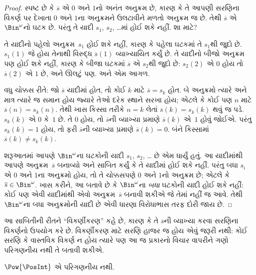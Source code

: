 \begin{proof}
સ્પષ્ટ છે કે $\overline{s}$ એ $0$ અને $1$નો અનંત અનુક્રમ છે,
કારણ કે તે આપણી સરણિના વિકર્ણ પર દેખાતા $0$ અને $1$ના
અનુક્રમને ઉલટાવીને મળતો અનુક્રમ જ છે. તેથી $\overline{s}$ એ
$\Bin^\omega$નો ઘટક છે. પરંતુ તે યાદી
$s_1$, $s_2$, \dots{}માં હોઈ શકે નહીં. શા માટે?

તે યાદીનો પહેલો અનુક્રમ~$s_1$ હોઈ શકે નહીં, કારણ કે પહેલા
ઘટકમાં તે $s_1$થી જુદો છે. $s_1(1)$ જે હોય તેનાથી
વિરુદ્ધ $\overline{s}(1)$ વ્યાખ્યાયિત કર્યું છે. તે યાદીનો
બીજો અનુક્રમ પણ હોઈ શકે નહીં, કારણ કે બીજા ઘટકમાં
$\overline{s}$ એ $s_2$થી જુદો છે: $s_2(2)$ એ $0$ હોય તો
$\overline{s}(2)$ એ $1$ છે, અને ઊલટું પણ. અને એમ આગળ.

વધુ ચોક્કસ રીતે: જો $\overline{s}$ યાદીમાં હોત, તો કોઈ $k$
માટે $\overline{s} = s_{k}$ હોત. બે અનુક્રમો ત્યારે અને માત્ર
ત્યારે જ સમાન હોય જ્યારે તેઓ દરેક સ્થાને સરખા હોય; એટલે કે કોઈ પણ
$n$ માટે $\overline{s}(n) = s_{k}(n)$. તેથી ખાસ કિસ્સા તરીકે
$n = k$ લેતાં $\overline{s}(k) = s_{k}(k)$ થવું જ પડે.
$s_k(k)$ એ $0$ કે~$1$ છે. તે $0$ હોય, તો $\overline{s}$ની
વ્યાખ્યા પ્રમાણે $\overline{s}(k)$ એ~$1$ હોવું જોઈએ. પરંતુ
$s_k(k) = 1$ હોય, તો ફરી $\overline{s}$ની વ્યાખ્યા પ્રમાણે
$\overline{s}(k) = 0$. બંને કિસ્સામાં
$\overline{s}(k) \neq s_{k}(k)$.

શરૂઆતમાં આપણે $\Bin^\omega$ના ઘટકોની યાદી
$s_1$, $s_2$, \dots{} છે એમ ધાર્યું હતું. આ યાદીમાંથી આપણે
અનુક્રમ~$\overline{s}$ બનાવ્યો અને સાબિત કર્યું કે તે યાદીમાં
હોઈ શકે નહીં. પરંતુ બધા $s_i$ એ $0$ અને $1$ના અનુક્રમો હોય,
તો તે ચોક્કસપણે $0$ અને $1$નો અનુક્રમ છે; એટલે કે
$\overline{s} \in \Bin^\omega$. ખાસ કરીને, આ બતાવે છે કે
$\Bin^\omega$ના \emph{બધા} ઘટકોની યાદી હોઈ શકે નહીં:
કોઈ પણ એવી યાદીમાંથી એવો અનુક્રમ~$\overline{s}$ બનાવી શકીએ
જે તેમાં નહીં જ આવે. તેથી $\Bin^\omega$ના બધા અનુક્રમોની યાદી
છે એવી ધારણા વિરોધાભાસ તરફ દોરી જાય છે.
\end{proof}

\begin{explain}
આ સાબિતીની રીતને ``વિકર્ણીકરણ'' કહે છે, કારણ કે તે
$\overline{s}$ની વ્યાખ્યા કરવા સરણિના વિકર્ણનો ઉપયોગ કરે છે.
વિકર્ણીકરણ માટે સરણિ હાજર જ હોય એવું જરૂરી નથી: કોઈ સરણિ કે
વાસ્તવિક વિકર્ણ ન હોય ત્યારે પણ આ જ પ્રકારનો વિચાર વાપરીને
ગણો પરિગણનીય નથી તે બતાવી શકીએ.
\end{explain}

\begin{thm}
$\Pow{\PosInt}$ એ પરિગણનીય નથી.
\end{thm}

